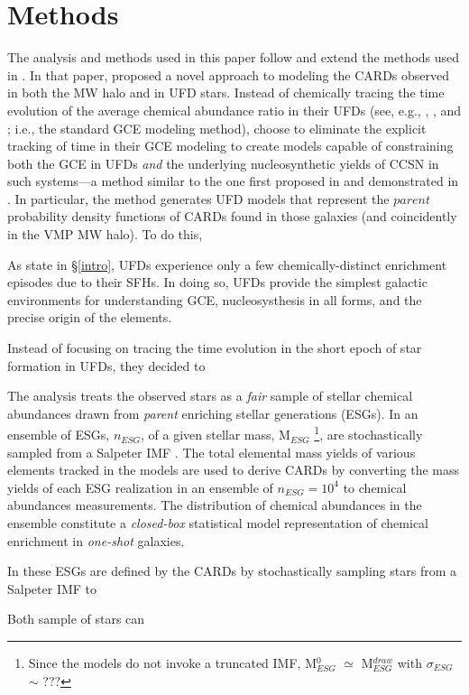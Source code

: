 \section{Methods}
\label{methods}

The analysis and methods used in this paper follow and extend the methods used in \citet{Lee_2013}. In that paper, \citet{Lee_2013} proposed a novel approach to modeling the CARDs observed in both the MW halo and in UFD stars. Instead of chemically tracing the time evolution of the average chemical abundance ratio in their UFDs (see, e.g., \citet{Cohen_2010}, \citet{?}, and \citet{?}; i.e., the standard GCE modeling method), \citet{Lee_2013} choose to eliminate the explicit tracking of time in their GCE modeling to create models capable of constraining both the GCE in UFDs {\it and} the underlying nucleosynthetic yields of CCSN in such systems---a method similar to the one first proposed in \citet{Karlsson2005a} and demonstrated in \citet{Karlsson2005b}. In particular, the method generates UFD models that represent the $parent$ probability density functions of CARDs found in those galaxies (and coincidently in the VMP MW halo). To do this, 


As state in \S\ref{intro}, UFDs experience only a few chemically-distinct enrichment episodes due to their SFHs. In doing so, UFDs provide the simplest galactic environments for understanding GCE, nucleosysthesis in all forms, and the precise origin of the elements. 


Instead of focusing on tracing the time evolution in the short epoch of star formation in UFDs, they decided to 



The analysis treats the observed stars as a {\it fair} sample of stellar chemical abundances drawn from {\it parent} enriching stellar generations (ESGs). In \citet{Lee_2013} an ensemble of ESGs, $n_{ESG}$, of a given stellar mass, M$_{ESG}$
\footnote{Since the models do not invoke a truncated IMF, M$_{ESG}^0$ $\simeq$ M$_{ESG}^{draw}$ with $\sigma_{ESG}$ $\sim$ ???}, 
are stochastically sampled from a Salpeter IMF \citep{Salpeter_1955}. The total elemental mass yields of various elements tracked in the models are used to derive CARDs by converting the mass yields of each ESG realization in an ensemble of $n_{ESG} = 10^4$ to chemical abundances measurements. The distribution of chemical abundances in the ensemble constitute a {\it closed-box} statistical model representation of chemical enrichment in {\it one-shot} galaxies. 


In \citet{Lee_2013} these ESGs are defined by the CARDs by stochastically sampling stars from a Salpeter IMF \citep{Salpeter_1955} to    

Both sample of stars can 